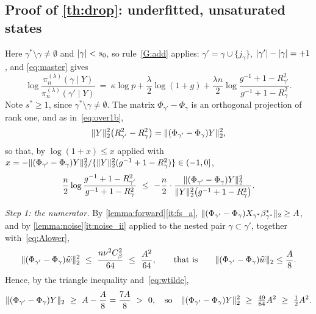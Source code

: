 \subsection{Proof of \cref{th:drop}: underfitted, unsaturated states}
\label{sub:under}

Here $\gamma^{\ast}\setminus\gamma\neq\emptyset$ and $\lvert\gamma\rvert<s_0$, so
rule~\ref{G:add} applies: $\gamma'=\gamma\cup\{j_\gamma\}$,
$\lvert\gamma'\rvert-\lvert\gamma\rvert=+1$, and \eqref{eq:master} gives
\begin{equation}
    \label{eq:und1}
    \log\frac{\pi_n^{(\lambda)}(\gamma\mid Y)}
    {\pi_n^{(\lambda)}(\gamma'\mid Y)}
    \ =\ \kappa\log p+\frac{\lambda}{2}\log(1+g)
    +\frac{\lambda n}{2}
    \log\frac{g^{-1}+1-R^{2}_{\gamma'}}{g^{-1}+1-R^{2}_{\gamma}} .
\end{equation}
Note $s^{\ast}\geq1$, since $\gamma^{\ast}\setminus\gamma\neq\emptyset$.
The matrix $\Phi_{\gamma'}-\Phi_\gamma$ is an orthogonal projection of
rank one, and as in~\eqref{eq:over1b},
\begin{equation}
    \label{eq:und1b}
    \lVert Y\rVert_2^{2}\bigl(R^{2}_{\gamma'}-R^{2}_{\gamma}\bigr)
    =\lVert(\Phi_{\gamma'}-\Phi_{\gamma})Y\rVert_2^{2} ,
\end{equation}
so that, by $\log(1+x)\leq x$ applied with
$x=-\lVert(\Phi_{\gamma'}-\Phi_\gamma)Y\rVert_2^{2}/
\{\lVert Y\rVert_2^{2}(g^{-1}+1-R^{2}_\gamma)\}\in(-1,0]$,
\begin{equation}
    \label{eq:und2}
    \frac n2\log\frac{g^{-1}+1-R^{2}_{\gamma'}}
    {g^{-1}+1-R^{2}_{\gamma}}
    \ \leq\ -\frac n2\cdot
    \frac{\lVert(\Phi_{\gamma'}-\Phi_\gamma)Y\rVert_2^{2}}
    {\lVert Y\rVert_2^{2}\bigl(g^{-1}+1-R^{2}_{\gamma}\bigr)} .
\end{equation}

\emph{Step 1: the numerator.} By \cref{lemma:forward}\ref{it:fs_a},
$\lVert(\Phi_{\gamma'}-\Phi_\gamma)X_{\gamma^{\ast}}\beta^{\ast}_{\gamma^{\ast}}\rVert_2\geq A$, and by
\cref{lemma:noise}\ref{it:noise_ii} applied to the nested pair
$\gamma\subset\gamma'$, together with~\eqref{eq:Alower},
\begin{equation}
    \label{eq:und3}
    \lVert(\Phi_{\gamma'}-\Phi_\gamma)\widetilde w\rVert_2^{2}
    \ \leq\ \frac{n\nu^{2}C_\beta^{2}}{64}\ \leq\ \frac{A^{2}}{64},
    \qquad\text{that is}\qquad
    \lVert(\Phi_{\gamma'}-\Phi_\gamma)\widetilde w\rVert_2
    \leq\frac{A}{8} .
\end{equation}
Hence, by the triangle inequality and~\eqref{eq:wtilde},
\begin{equation}
    \label{eq:und4}
    \lVert(\Phi_{\gamma'}-\Phi_\gamma)Y\rVert_2
    \ \geq\ A-\frac{A}{8}=\frac{7A}{8}\ >\ 0,
    \quad\text{so}\quad
    \lVert(\Phi_{\gamma'}-\Phi_\gamma)Y\rVert_2^{2}
    \ \geq\ \tfrac{49}{64}A^{2}\ \geq\ \tfrac12A^{2} .
\end{equation}

